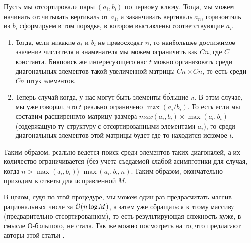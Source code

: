 \begin{solution}
\begin{upd}
        Пусть мы отсортировали пары $(a_i, b_i)$ по первому ключу. Тогда, мы можем начинать отсчитывать вертикаль от $a_1$, а заканчивать вертикаль $a_n$, горизонталь из $b_i$ сформируем в том порядке, в котором выставлены соответствующие $a_i$.
        \begin{enumerate}[1)]
            \item 
            Тогда, если никакие $a_i$ и $b_i$ не превосходят $n$, то наибольшее достижимое значение числителя и знаменателя мы можем ограничить как $Cn$, где $C$ константа. Бинпоиск же интересующего нас $t$ можно организовать среди диагональных элементов такой увеличенной матрицы $Cn \times Cn$, то есть среди $Cn$ штук элементов.
            \item
            Теперь случай когда, у нас могут быть элементы б\'ольшие $n$. В этом случае, мы уже говорил, что $t$ реально ограничено $\max(a_i/b_i)$. То есть если мы составим расширенную матрицу размера $max(a_i, b_i) \times \max(a_i, b_i)$ (содержащую ту структуру с отсортированными элементами $a_i$), то среди диагональных элементов этой матрицы будет где-то находится искомое $t$.
        \end{enumerate}
        Таким образом, реально ведется поиск среди элементов таких диагоналей, а их количество ограничивается (без учета съедаемой слабой асимптотики для случая, когда $n > \max(a_i, b_i)$) $\max(a_i, b_i, n)$.
        Таким образом, окончательно приходим к ответы для исправленной $M$.
    \end{upd}
    \begin{upd}
        В целом, судя по этой процедуре, мы можем один раз предрасчитать массив рациональных числе за $\mathcal{O}(n\log M)$, а затем уже обращаться к этому массиву (предварительно отсортированном), то есть результирующая сложность хуже, в смысле О-большого, не стала.
        Так же можно посмотреть на то, что предлагают авторы этой статьи \cite{KWEK200323}.
    \end{upd}
\end{solution}